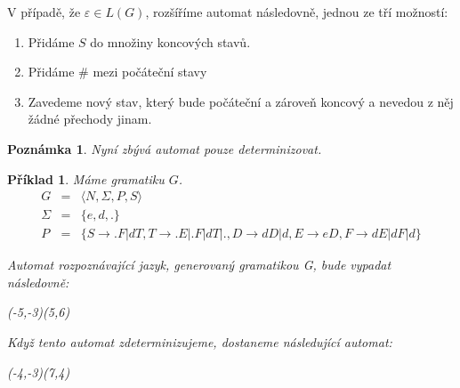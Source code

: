 \documentclass[10pt, a4paper, titlepage]{article}
\theoremstyle{note}
\newtheorem{priklad}{\textbf{Příklad}}
\newtheorem{poznamka}{\textbf{Poznámka}}
\begin{document}
V případě, že $\varepsilon \in L(G)$, rozšíříme automat následovně, jednou ze tří možností:
\begin{enumerate}
\item
Přidáme $S$ do množiny koncových stavů.

\item
Přidáme $\#$ mezi počáteční stavy

\item
Zavedeme nový stav, který bude počáteční a zároveň koncový a nevedou z něj žádné přechody jinam.
\end{enumerate}

\begin{poznamka}
Nyní zbývá automat pouze determinizovat.
\end{poznamka}

\begin{priklad}
Máme gramatiku $G$.
\begin{eqnarray*}
G &=& \langle N,\Sigma,P,S \rangle \\
\Sigma &=& \lbrace e,d,. \rbrace \\
P &=& \lbrace S \rightarrow .F | dT , T \rightarrow .E|.F|dT|. , D \rightarrow dD|d , E \rightarrow eD , F \rightarrow dE|dF|d \rbrace
\end{eqnarray*}

Automat rozpoznávající jazyk, generovaný gramatikou G, bude vypadat následovně:

\begin{center}
\begin{VCPicture}{(-5,-3)(5,6)}
\end{VCPicture}
\end{center}

Když tento automat zdeterminizujeme, dostaneme následující automat:

\begin{center}
\begin{VCPicture}{(-4,-3)(7,4)}
\end{VCPicture}
\end{center}

\end{priklad}
\end{document}
